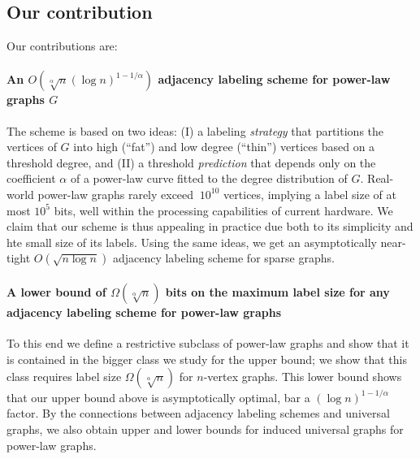 \subsection{Our contribution}

Our contributions are:

\paragraph{An  $O(\sqrt[\alpha] n (\log n)^{1 - 1/\alpha})$ adjacency labeling scheme for power-law graphs $G$}
The scheme is based on two ideas:
(I) a labeling \emph{strategy} that  partitions the vertices of $G$ into high (``fat'') and low degree (``thin'') vertices based on a threshold degree, and (II) a threshold \emph{prediction} that depends only on the coefficient $\alpha$ of a power-law curve fitted to the degree distribution of $G$. 
Real-world power-law graphs rarely exceed  $~10^{10}$ vertices, implying a label size of at most  ${10^{5}}$ bits, well within the processing capabilities of current hardware. 
We claim that our  scheme is thus appealing in practice   due both to  its simplicity and hte small size of its labels.
Using the same ideas, we get an  asymptotically near-tight  $O(\sqrt{n \log n})$ adjacency labeling scheme for sparse graphs.

\paragraph{A lower bound of $\Omega(\sqrt[\alpha]{n})$ bits on the maximum label size for any adjacency labeling scheme for power-law graphs}
To this end we define a  restrictive subclass of power-law graphs and show that it is contained in the bigger class we study for the upper bound; we show that this class requires label size $\Omega(\sqrt[\alpha]{n})$ for $n$-vertex graphs.
This lower bound shows that our upper bound above is asymptotically  optimal, bar a $(\log n)^{1 - 1/\alpha}$ factor.
By the connections between adjacency labeling schemes and universal graphs, we also obtain upper and lower bounds for induced universal graphs for power-law graphs. 


